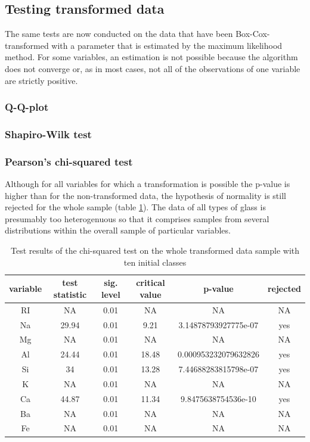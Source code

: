 \documentclass[a4paper, 12pt, titlepage, headsepline, listof = totoc, bibliography = totoc, numbers = noenddot]{scrartcl}
\begin{document}
\subsection{Testing transformed data}

The same tests are now conducted on the data that have been Box-Cox-transformed with a parameter that is estimated by the maximum likelihood method. For some variables, an estimation is not possible because the algorithm does not converge or, as in most cases, not all of the observations of one variable are strictly positive.

\subsubsection{Q-Q-plot}

\subsubsection{Shapiro-Wilk test}

\subsubsection{Pearson's chi-squared test}
Although for all variables for which a transformation is possible the p-value is higher than for the non-transformed data, the hypothesis of normality is still rejected for the whole sample (table \ref{tab:chi-full-trans}). The data of all types of glass is presumably too heterogenuous so that it comprises samples from several distributions within the overall sample of particular variables.

\begin{table}[h!]
\centering
\begin{tabular}{|cccccc|} \hline variable & test statistic & sig. level & critical value & p-value & rejected\\ \hline RI & NA & 0.01 & NA & NA & NA\\ 
Na & 29.94 & 0.01 & 9.21 & 3.14878793927775e-07 & yes\\ 
Mg & NA & 0.01 & NA & NA & NA\\ 
Al & 24.44 & 0.01 & 18.48 & 0.000953232079632826 & yes\\ 
Si & 34 & 0.01 & 13.28 & 7.44688283815798e-07 & yes\\ 
K & NA & 0.01 & NA & NA & NA\\ 
Ca & 44.87 & 0.01 & 11.34 & 9.8475638754536e-10 & yes\\ 
Ba & NA & 0.01 & NA & NA & NA\\ 
Fe & NA & 0.01 & NA & NA & NA\\ \hline \end{tabular}\caption{Test results of the chi-squared test on the whole transformed data sample with ten initial classes}
\label{tab:chi-full-trans}
\end{table}
\end{document}
